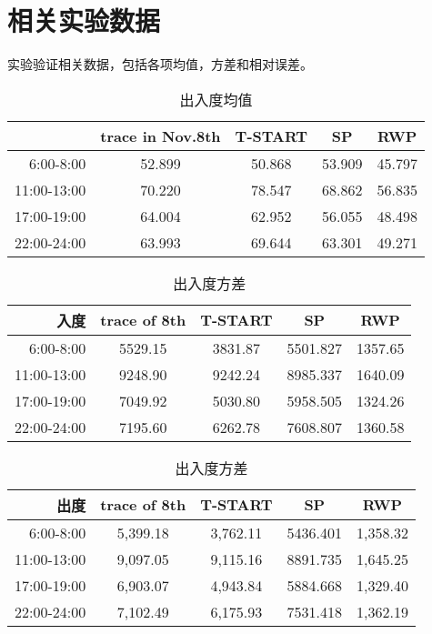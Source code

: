 \chapter{相关实验数据}

实验验证相关数据，包括各项均值，方差和相对误差。
\begin{table}[t]
\caption{出入度均值}\label{table_avg_inoutdegree}
\centering
\begin{tabular}{r|c|c|c|c}
\hline
	&trace in Nov.8th	&T-START &SP &RWP\\
\hline
6:00-8:00&
52.899&50.868&53.909&45.797\\
11:00-13:00&
70.220&78.547&68.862&56.835\\  
17:00-19:00&
64.004&62.952&56.055&48.498\\
22:00-24:00&
63.993&69.644&63.301&49.271\\	
\hline
\end{tabular}
\end{table}

\begin{table}[t]
\caption{出入度方差}\label{table_variance}
\centering
\begin{tabular}{r|c|c|c|c}
\hline
	入度&trace of 8th	&T-START &SP &RWP\\
\hline
 6:00-8:00	&
5529.15&	3831.87&5501.827&	1357.65\\ 
 11:00-13:00&
9248.90&	9242.24&	8985.337&	1640.09\\
 17:00-19:00&
7049.92&	5030.80&	5958.505&	1324.26\\
 22:00-24:00&
7195.60&	6262.78&	7608.807&	1360.58\\
\hline
\end{tabular}
\begin{tabular}{r|c|c|c|c}
	出度&trace of 8th	&T-START &SP &RWP\\
\hline
 6:00-8:00	&
5,399.18&3,762.11&5436.401&1,358.32\\
 11:00-13:00&
9,097.05&9,115.16&8891.735&1,645.25\\
 17:00-19:00&
6,903.07&4,943.84&5884.668&1,329.40\\
 22:00-24:00&
7,102.49&6,175.93&7531.418&1,362.19\\
\hline
\end{tabular}
\end{table}


